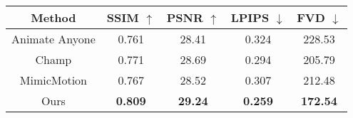 \begin{tabular}{@{}ccccc@{}}
\toprule
Method         & SSIM $\uparrow$                      & PSNR $\uparrow$                     & LPIPS $\downarrow$                    & FVD  $\downarrow$                      \\ \midrule
Animate Anyone\cite{aa} & 0.761          & 28.41        & 0.324           & 228.53                      \\
Champ\cite{champ}          & 0.771          &  28.69         & 0.294         & 205.79 \\
MimicMotion\cite{mimicmotion}  & 0.767           & 28.52            & 0.307        & 212.48   \\
Ours           & \textbf{0.809}            & \textbf{29.24}            & \textbf{0.259}            & \textbf{172.54}            \\ \bottomrule
\end{tabular}
